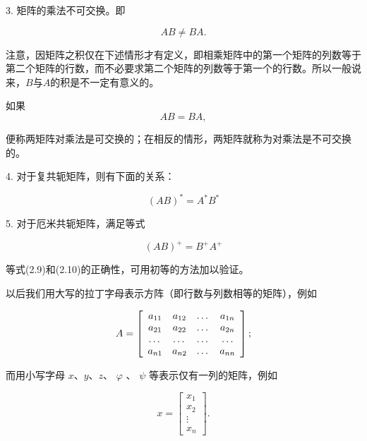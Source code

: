 3. 矩阵的乘法不可交换。即

\begin{equation*}
A B \neq B A.
\end{equation*}

注意，因矩阵之积仅在下述情形才有定义，即相乘矩阵中的第一个矩阵的列数等于第二个矩阵的行数，而不必要求第二个矩阵的列数等于第一个的行数。所以一般说来，$B$与$A$的积是不一定有意义的。

如果
\begin{equation*}
A B = B A,
\end{equation*}

便称两矩阵对乘法是可交换的；在相反的情形，两矩阵就称为对乘法是不可交换的。

4. 对于复共轭矩阵，则有下面的关系：

\begin{equation*}
(A B) ^ {*} = A ^ {*} B ^ {*}\tag{2.9}
\end{equation*}

5. 对于厄米共轭矩阵，满足等式

\begin{equation*}
(A B) ^ {+} = B ^ {+} A ^ {+}\tag{2.10}
\end{equation*}

等式(2.9)和(2.10)的正确性，可用初等的方法加以验证。

以后我们用大写的拉丁字母表示方阵（即行数与列数相等的矩阵），例如

\begin{equation*}
A = \left[ \begin{array}{c c c c} a _ {1 1} & a _ {1 2} & \dots & a _ {1 n} \\ a _ {2 1} & a _ {2 2} & \dots & a _ {2 n} \\ \dots & \dots & \dots & \dots \\ a _ {n 1} & a _ {n 2} & \dots & a _ {n n} \end{array} \right];
\end{equation*}

而用小写字母 $x$、$y$、$z$、 $\varphi$ 、 $\psi$ 等表示仅有一列的矩阵，例如

\begin{equation*}
x = \left[ \begin{array}{c} x _ {1} \\ x _ {2} \\ \vdots \\ x _ {n} \end{array} \right].
\end{equation*}

